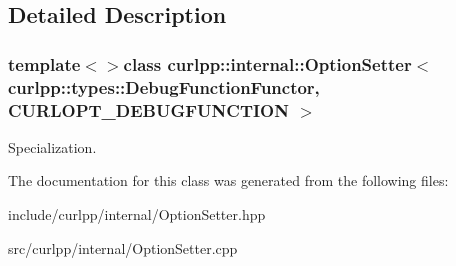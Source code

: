 \subsection{Detailed Description}
\subsubsection*{template$<$$>$class curlpp\-::internal\-::\-Option\-Setter$<$ curlpp\-::types\-::\-Debug\-Function\-Functor, C\-U\-R\-L\-O\-P\-T\-\_\-\-D\-E\-B\-U\-G\-F\-U\-N\-C\-T\-I\-O\-N $>$}

Specialization. 

The documentation for this class was generated from the following files\-:\begin{DoxyCompactItemize}
\item 
include/curlpp/internal/Option\-Setter.\-hpp\item 
src/curlpp/internal/Option\-Setter.\-cpp\end{DoxyCompactItemize}
